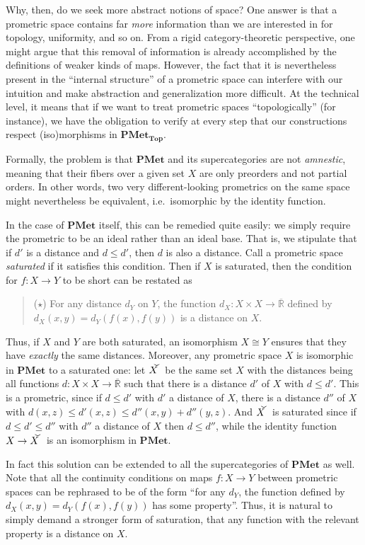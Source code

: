 \documentclass{article}
\def\R{\mathbb{R}}
\def\Re{\overline{\R}}
\def\sat#1{\widecheck{#1}}
\def\PMet{\mathbf{PMet}}
\def\PMetTop{\mathbf{PMet}_{\mathbf{Top}}}
\begin{document}
Why, then, do we seek more abstract notions of space?
One answer is that a prometric space contains far \emph{more} information than we are interested in for topology, uniformity, and so on.
From a rigid category-theoretic perspective, one might argue that this removal of information is already accomplished by the definitions of weaker kinds of maps.
However, the fact that it is nevertheless present in the ``internal structure'' of a prometric space can interfere with our intuition and make abstraction and generalization more difficult.
At the technical level, it means that if we want to treat prometric spaces ``topologically'' (for instance), we have the obligation to verify at every step that our constructions respect (iso)morphisms in $\PMetTop$.

Formally, the problem is that $\PMet$ and its supercategories are not \emph{amnestic}, meaning that their fibers over a given set $X$ are only preorders and not partial orders.
In other words, two very different-looking prometrics on the same space might nevertheless be equivalent, i.e.\ isomorphic by the identity function.

In the case of $\PMet$ itself, this can be remedied quite easily: we simply require the prometric to be an ideal rather than an ideal base.
That is, we stipulate that if $d'$ is a distance and $d\le d'$, then $d$ is also a distance.
Call a prometric space \emph{saturated} if it satisfies this condition.
Then if $X$ is saturated, then the condition for $f:X\to Y$ to be short can be restated as
\begin{quote}
  ($\star$) For any distance $d_Y$ on $Y$, the function $d_X:X\times X\to \Re$ defined by $d_X(x,y) = d_Y(f(x),f(y))$ is a distance on $X$.
\end{quote}
Thus, if $X$ and $Y$ are both saturated, an isomorphism $X\cong Y$ ensures that they have \emph{exactly} the same distances.
Moreover, any prometric space $X$ is isomorphic in $\PMet$ to a saturated one: let $\sat{X}$ be the same set $X$ with the distances being all functions $d:X\times X\to \Re$ such that there is a distance $d'$ of $X$ with $d\le d'$.
This is a prometric, since if $d\le d'$ with $d'$ a distance of $X$, there is a distance $d''$ of $X$ with $d(x,z) \le d'(x,z) \le d''(x,y)+d''(y,z)$.
And $\sat{X}$ is saturated since if $d\le d' \le d''$ with $d''$ a distance of $X$ then $d\le d''$, while the identity function $X\to \sat{X}$ is an isomorphism in $\PMet$.

In fact this solution can be extended to all the supercategories of $\PMet$ as well.
Note that all the continuity conditions on maps $f:X\to Y$ between prometric spaces can be rephrased to be of the form ``for any $d_Y$, the function defined by $d_X(x,y) = d_Y(f(x),f(y))$ has some property''.
Thus, it is natural to simply demand a stronger form of saturation, that any function with the relevant property is a distance on $X$.
\end{document}
